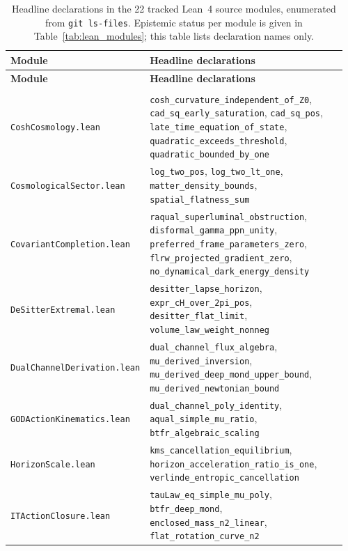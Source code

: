 \small
\begin{longtable}{@{}>{\raggedright\arraybackslash}p{0.36\linewidth}>{\raggedright\arraybackslash}p{0.60\linewidth}@{}}
\caption{Headline declarations in the 22 tracked Lean~4 source modules, enumerated from
\texttt{git ls-files}. Epistemic status per module is given in
Table~\ref{tab:lean_modules}; this table lists declaration names only.}
\label{tab:lean_declarations}\\
\toprule
\textbf{Module} & \textbf{Headline declarations} \\
\midrule
\endfirsthead
\toprule
\textbf{Module} & \textbf{Headline declarations} \\
\midrule
\endhead
\bottomrule
\endfoot
\multicolumn{2}{@{}l}{\emph{Proof modules}} \\ \midrule
\texttt{CoshCosmology.lean} & \texttt{cosh\_curvature\_independent\_of\_Z0}, \texttt{cad\_sq\_early\_saturation}, \texttt{cad\_sq\_pos}, \texttt{late\_time\_equation\_of\_state}, \texttt{quadratic\_exceeds\_threshold}, \texttt{quadratic\_bounded\_by\_one} \\
\texttt{CosmologicalSector.lean} & \texttt{log\_two\_pos}, \texttt{log\_two\_lt\_one}, \texttt{matter\_density\_bounds}, \texttt{spatial\_flatness\_sum} \\
\texttt{CovariantCompletion.lean} & \texttt{raqual\_superluminal\_obstruction}, \texttt{disformal\_gamma\_ppn\_unity}, \texttt{preferred\_frame\_parameters\_zero}, \texttt{flrw\_projected\_gradient\_zero}, \texttt{no\_dynamical\_dark\_energy\_density} \\
\texttt{DeSitterExtremal.lean} & \texttt{desitter\_lapse\_horizon}, \texttt{expr\_cH\_over\_2pi\_pos}, \texttt{desitter\_flat\_limit}, \texttt{volume\_law\_weight\_nonneg} \\
\texttt{DualChannelDerivation.lean} & \texttt{dual\_channel\_flux\_algebra}, \texttt{mu\_derived\_inversion}, \texttt{mu\_derived\_deep\_mond\_upper\_bound}, \texttt{mu\_derived\_newtonian\_bound} \\
\texttt{GODActionKinematics.lean} & \texttt{dual\_channel\_poly\_identity}, \texttt{aqual\_simple\_mu\_ratio}, \texttt{btfr\_algebraic\_scaling} \\
\texttt{HorizonScale.lean} & \texttt{kms\_cancellation\_equilibrium}, \texttt{horizon\_acceleration\_ratio\_is\_one}, \texttt{verlinde\_entropic\_cancellation} \\
\texttt{ITActionClosure.lean} & \texttt{tauLaw\_eq\_simple\_mu\_poly}, \texttt{btfr\_deep\_mond}, \texttt{enclosed\_mass\_n2\_linear}, \texttt{flat\_rotation\_curve\_n2} \\

\end{longtable}
